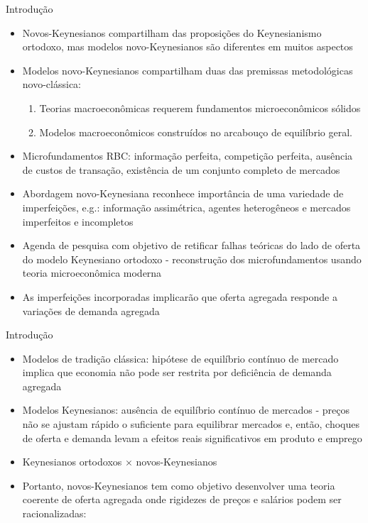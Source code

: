 \documentclass[10pt]{beamer}
\begin{document}
\begin{frame}{Introdução}
    \begin{itemize}
        \item Novos-Keynesianos compartilham das proposições do Keynesianismo ortodoxo, mas modelos novo-Keynesianos são diferentes em muitos aspectos\bigskip
        \item Modelos novo-Keynesianos compartilham duas das premissas metodológicas novo-clássica:\bigskip
        \begin{enumerate}
            \item Teorias macroeconômicas requerem fundamentos microeconômicos sólidos\bigskip
            \item Modelos macroeconômicos construídos no arcabouço de equilíbrio geral.
        \end{enumerate}
        \item Microfundamentos RBC: informação perfeita, competição perfeita, ausência de custos de transação, existência de um conjunto completo de mercados\bigskip
        \item Abordagem novo-Keynesiana reconhece importância de uma variedade de imperfeições, e.g.: informação assimétrica, agentes heterogêneos e mercados imperfeitos e incompletos\bigskip
        \item Agenda de pesquisa com objetivo de retificar falhas teóricas do lado de oferta do modelo Keynesiano ortodoxo - reconstrução dos microfundamentos usando teoria microeconômica moderna\bigskip
        \item As imperfeições incorporadas implicarão que oferta agregada responde a variações de demanda agregada
    \end{itemize}
\end{frame}    

\begin{frame}{Introdução}
    \begin{itemize}
        \item Modelos de tradição clássica: hipótese de equilíbrio contínuo de mercado implica que economia não pode ser restrita por deficiência de demanda agregada\bigskip
        
        \item Modelos Keynesianos: ausência de equilíbrio contínuo de mercados - preços não se ajustam rápido o suficiente para equilibrar mercados e, então, choques de oferta e demanda levam a efeitos reais significativos em produto e emprego\bigskip
        \item Keynesianos ortodoxos $\times$ novos-Keynesianos\bigskip
        \item Portanto, novos-Keynesianos tem como objetivo desenvolver uma teoria coerente de oferta agregada onde rigidezes de preços e salários podem ser racionalizadas:\bigskip
        
    \end{itemize}
\end{frame}
\end{document}
